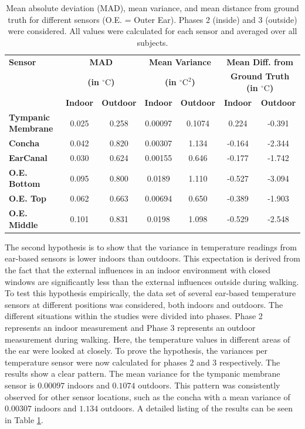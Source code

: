 \begin{table}[t]
\centering
\begin{tabular}{|p{2.5cm}|c|c|c|c|c|c|}
\hline
\textbf{Sensor} & \multicolumn{2}{c|}{\textbf{MAD}} & \multicolumn{2}{c|}{\textbf{Mean Variance}} & \multicolumn{2}{c|}{\textbf{Mean Diff. from}} \\
 & \multicolumn{2}{c|}{\textbf{(in \(^\circ\text{C}\))}} & \multicolumn{2}{c|}{\textbf{(in \(^\circ\text{C}^2\))}} & \multicolumn{2}{c|}{\textbf{Ground Truth (in \(^\circ\text{C}\))}} \\
\hline
 & \textbf{Indoor} & \textbf{Outdoor} & \textbf{Indoor} & \textbf{Outdoor} & \textbf{Indoor} & \textbf{Outdoor} \\
\hline
\textbf{Tympanic Membrane} & 0.025 & 0.258 & 0.00097 & 0.1074 & 0.224 & -0.391 \\
\textbf{Concha} & 0.042 & 0.820 & 0.00307 & 1.134 & -0.164 & -2.344 \\
\textbf{EarCanal} & 0.030 & 0.624 & 0.00155 & 0.646 & -0.177 & -1.742 \\
\textbf{O.E. Bottom} & 0.095 & 0.800 & 0.0189 & 1.110 & -0.527 & -3.094 \\
\textbf{O.E. Top} & 0.062 & 0.663 & 0.00694 & 0.650 & -0.389 & -1.903 \\
\textbf{O.E. Middle} & 0.101 & 0.831 & 0.0198 & 1.098 & -0.529 & -2.548 \\
\hline
\end{tabular}
\caption{Mean absolute deviation (MAD), mean variance, and mean distance from ground truth for different sensors (O.E. = Outer Ear). Phases 2 (inside) and 3 (outside) were considered. All values were calculated for each sensor and averaged over all subjects.}
\label{subsec:Evaluation:Study1:Hypothesis2:mean_variance_table}
\end{table}

The second hypothesis is to show that the variance in temperature readings from ear-based sensors is lower indoors than outdoors.
This expectation is derived from the fact that the external influences in an indoor environment with closed windows are significantly less than the external influences outside during walking.
To test this hypothesis empirically, the data set of several ear-based temperature sensors at different positions was considered, both indoors and outdoors.
The different situations within the studies were divided into phases. 
Phase 2 represents an indoor measurement and Phase 3 represents an outdoor measurement during walking.
Here, the temperature values in different areas of the ear were looked at closely.
To prove the hypothesis, the variances per temperature sensor were now calculated for phases 2 and 3 respectively. 
The results show a clear pattern. 
The mean variance for the tympanic membrane sensor is $0.00097$ indoors and $0.1074$ outdoors.
This pattern was consistently observed for other sensor locations, such as the concha with a mean variance of $0.00307$ indoors and $1.134$ outdoors.
A detailed listing of the results can be seen in Table \ref{subsec:Evaluation:Study1:Hypothesis2:mean_variance_table}.

